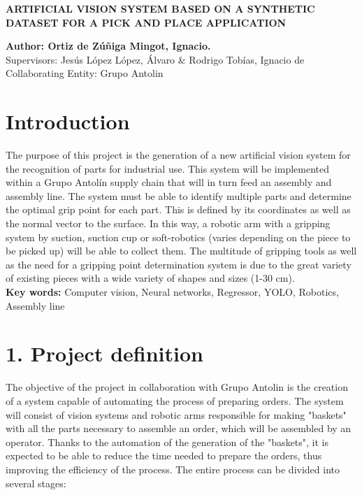 {\setlength{\parindent}{0pt}
\begin{Large}
\textbf{ARTIFICIAL VISION SYSTEM BASED ON A SYNTHETIC DATASET FOR A PICK AND PLACE APPLICATION}
\end{Large}

\textbf{Author: Ortiz de Zúñiga Mingot, Ignacio.} \\
Supervisors: Jesús López López, Álvaro \& Rodrigo Tobías, Ignacio de \\
Collaborating Entity: Grupo Antolin \\

\section*{Introduction}
The purpose of this project is the generation of a new artificial vision system for the recognition of parts for industrial use. This system will be implemented within a Grupo Antolín\textsuperscript{\textregistered} supply chain that will in turn feed an assembly and assembly line. The system must be able to identify multiple parts and determine the optimal grip point for each part. This is defined by its coordinates as well as the normal vector to the surface. In this way, a robotic arm with a gripping system by suction, suction cup or soft-robotics (varies depending on the piece to be picked up) will be able to collect them. The multitude of gripping tools as well as the need for a gripping point determination system is due to the great variety of existing pieces with a wide variety of shapes and sizes (1-30 cm).\\
\textbf{Key words:} Computer vision, Neural networks, Regressor, YOLO, Robotics, Assembly line

\section*{1. Project definition}
The objective of the project in collaboration with Grupo Antolin is the creation of a system capable of automating the process of preparing orders. The system will consist of vision systems and robotic arms responsible for making "baskets" with all the parts necessary to assemble an order, which will be assembled by an operator. Thanks to the automation of the generation of the "baskets", it is expected to be able to reduce the time needed to prepare the orders, thus improving the efficiency of the process. The entire process can be divided into several stages:

}
